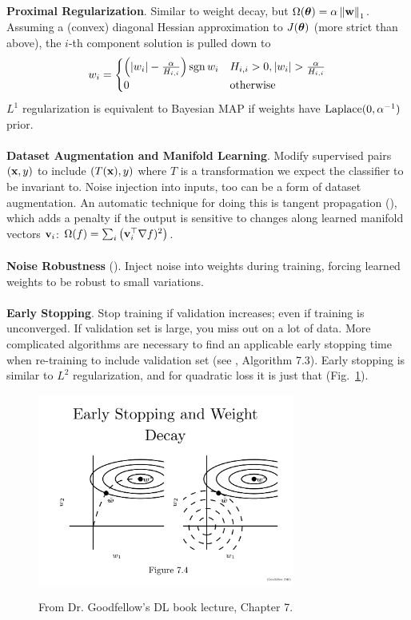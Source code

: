 \documentclass{article}
\begin{document}
\\\\
\noindent
\textbf{Proximal Regularization}. Similar to weight decay, but $\Omega({\boldsymbol\theta})=\alpha\left\| \textbf{w} \right\|_1$. Assuming a (convex) diagonal Hessian approximation to $J({\boldsymbol\theta})$ (more strict than above), the $i$-th component solution is pulled down to
$$w_i=\begin{cases}
\pa{\abs{w_i}-\frac{\alpha}{H_{i,i}}}\sgn w_i  & H_{i,i}>0, \abs{w_i}>\frac{\alpha}{H_{i,i}}\\
  0 & \text{otherwise}
\end{cases}$$
$L^1$ regularization is equivalent to Bayesian MAP if weights have $\operatorname{Laplace}(0, \alpha^{-1})$ prior.
\\\\
\noindent
\textbf{Dataset Augmentation and Manifold Learning}. Modify supervised pairs $(\textbf{x}, y)$ to include $(T(\textbf{x}), y)$ where $T$ is a transformation we expect the classifier to be invariant to. Noise injection into inputs, too can be a form of dataset augmentation. An automatic technique for doing this is tangent propagation (), which adds a penalty if the output is sensitive to changes along learned manifold vectors $\textbf{v}_i$: $\Omega(f)=\sum_i\left({\textbf{v}_i^\top\nabla f)^2}\right)$.
\\\\
\noindent
\textbf{Noise Robustness} (). Inject noise into weights during training, forcing learned weights to be robust to small variations.
\\\\
\noindent
\textbf{Early Stopping}. Stop training if validation increases; even if training is unconverged. If validation set is large, you miss out on a lot of data. More complicated algorithms are necessary to find an applicable early stopping time when re-training to include validation set (see , Algorithm 7.3). Early stopping is similar to $L^2$ regularization, and for quadratic loss it is just that (Fig.~\ref{fig:earlystop}).
\begin{figure}[!h]
\centering
{\includegraphics[width=0.75\textwidth]{early-stop.pdf}}
  \caption{From Dr. Goodfellow's DL book lecture, Chapter 7.}
\label{fig:earlystop}
\end{figure}
\end{document}
